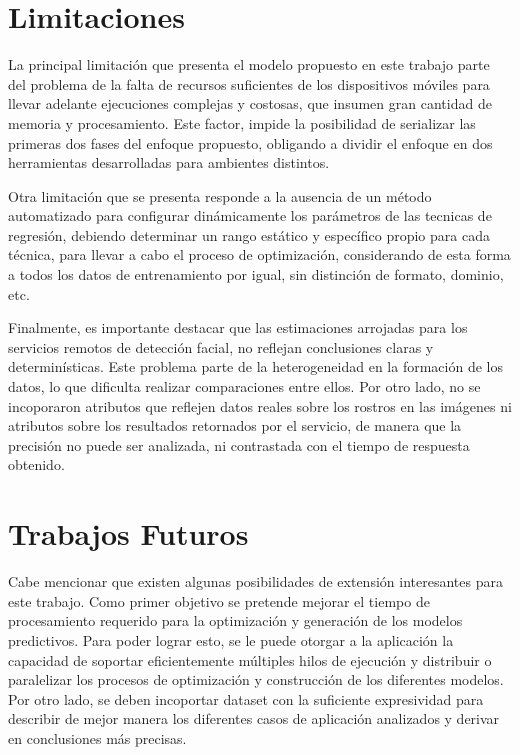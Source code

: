 \section{Limitaciones}

La principal limitación que presenta el modelo propuesto en este trabajo
parte del problema de la falta de recursos suficientes de los dispositivos
móviles para llevar adelante ejecuciones complejas y costosas, que
insumen gran cantidad de memoria y procesamiento. Este factor, impide
la posibilidad de serializar las primeras dos fases del enfoque propuesto,
obligando a dividir el enfoque en dos herramientas desarrolladas para
ambientes distintos. 

Otra limitación que se presenta responde a la ausencia de un método
automatizado para configurar dinámicamente los parámetros de las tecnicas
de regresión, debiendo determinar un rango estático y específico propio
para cada técnica, para llevar a cabo el proceso de optimización,
considerando de esta forma a todos los datos de entrenamiento por
igual, sin distinción de formato, dominio, etc.

Finalmente, es importante destacar que las estimaciones arrojadas
para los servicios remotos de detección facial, no reflejan conclusiones
claras y determinísticas. Este problema parte de la heterogeneidad
en la formación de los datos, lo que dificulta realizar comparaciones
entre ellos. Por otro lado, no se incoporaron atributos que reflejen
datos reales sobre los rostros en las imágenes ni atributos sobre
los resultados retornados por el servicio, de manera que la precisión
no puede ser analizada, ni contrastada con el tiempo de respuesta
obtenido.


\section{Trabajos Futuros}

Cabe mencionar que existen algunas posibilidades de extensión interesantes
para este trabajo. Como primer objetivo se pretende mejorar el tiempo
de procesamiento requerido para la optimización y generación de los
modelos predictivos. Para poder lograr esto, se le puede otorgar a
la aplicación la capacidad de soportar eficientemente múltiples hilos
de ejecución y distribuir o paralelizar los procesos de optimización
y construcción de los diferentes modelos. Por otro lado, se deben
incoportar dataset con la suficiente expresividad para describir de
mejor manera los diferentes casos de aplicación analizados y derivar
en conclusiones más precisas.

